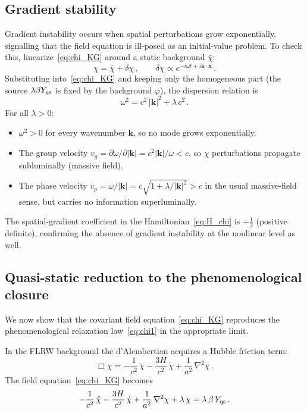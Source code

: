 \documentclass[11pt]{article}
\begin{document}
\subsection{Gradient stability}\label{sec:gradient}
Gradient instability occurs when spatial perturbations
grow exponentially, signalling that the field equation
is ill-posed as an initial-value problem.
To check this, linearize~\eqref{eq:chi_KG} around a
static background $\bar\chi$:
\begin{equation}
\chi = \bar\chi + \delta\chi\,,\qquad
\delta\chi \propto e^{-i\omega t + i\mathbf{k}\cdot\mathbf{x}}\,.
\label{eq:pert_ansatz}
\end{equation}
Substituting into~\eqref{eq:chi_KG} and keeping only
the homogeneous part (the source $\lambda\beta Y_{\rm qs}$ is
fixed by the background $\varphi$), the dispersion
relation is
\begin{equation}
\boxed{\omega^2 = c^2\,|\mathbf{k}|^2 + \lambda\,c^2\,.}
\label{eq:dispersion_app13}
\end{equation}
For all $\lambda > 0$:
\begin{itemize}
\item $\omega^2 > 0$ for every wavenumber $\mathbf{k}$,
  so no mode grows exponentially.
\item The group velocity
  $v_g = \partial\omega/\partial|\mathbf{k}|
  = c^2|\mathbf{k}|/\omega < c$,
  so $\chi$ perturbations propagate subluminally
  (massive field).
\item The phase velocity $v_p = \omega/|\mathbf{k}|
  = c\sqrt{1 + \lambda/|\mathbf{k}|^2} > c$ in the
  usual massive-field sense, but carries no information
  superluminally.
\end{itemize}
The spatial-gradient coefficient in the
Hamiltonian~\eqref{eq:H_chi} is $+\tfrac{1}{2}$
(positive definite), confirming the absence of
gradient instability at the nonlinear level as well.

\subsection{Quasi-static reduction to the phenomenological
  closure}\label{sec:qsreduction}
We now show that the covariant field
equation~\eqref{eq:chi_KG} reproduces the
phenomenological relaxation law~\eqref{eq:chi1}
in the appropriate limit.

In the FLRW background the d'Alembertian acquires
a Hubble friction term:
\begin{equation}
\Box\chi = -\frac{1}{c^2}\,\ddot\chi
  - \frac{3H}{c^2}\,\dot\chi
  + \frac{1}{a^2}\,\nabla^2\chi\,.
\label{eq:box_flrw}
\end{equation}
The field equation~\eqref{eq:chi_KG} becomes
\begin{equation}
-\frac{1}{c^2}\,\ddot\chi
  - \frac{3H}{c^2}\,\dot\chi
  + \frac{1}{a^2}\,\nabla^2\chi
  + \lambda\,\chi
  = \lambda\,\beta\,Y_{\rm qs}\,.
\label{eq:chi_flrw}
\end{equation}
\end{document}
